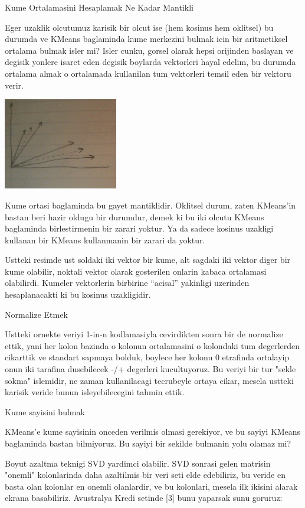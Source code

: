 \documentclass[12pt,fleqn]{article}\usepackage{../common}
\begin{document}
Kume Ortalamasini Hesaplamak Ne Kadar Mantikli

Eger uzaklik olcutumuz karisik bir olcut ise (hem kosinus hem oklitsel) bu
durumda ve KMeans baglaminda kume merkezini bulmak icin bir aritmetiksel
ortalama bulmak isler mi? Isler cunku, gorsel olarak hepsi orijinden
baslayan ve degisik yonlere isaret eden degisik boylarda vektorleri hayal
edelim, bu durumda ortalama almak o ortalamada kullanilan tum vektorleri
temsil eden bir vektoru verir. 

\includegraphics[height=4cm]{kmeans_5.jpg}

Kume ortasi baglaminda bu gayet mantiklidir. Oklitsel durum, zaten
KMeans'in bastan beri hazir oldugu bir durumdur, demek ki bu iki olcutu
KMeans baglaminda birlestirmenin bir zarari yoktur. Ya da sadece kosinus
uzakligi kullanan bir KMeans kullanmanin bir zarari da yoktur. 

Ustteki resimde ust soldaki iki vektor bir kume, alt sagdaki iki vektor
diger bir kume olabilir, noktali vektor olarak gosterilen onlarin kabaca
ortalamasi olabilirdi. Kumeler vektorlerin birbirine ``acisal'' yakinligi
uzerinden hesaplanacakti ki bu kosinus uzakligidir.

Normalize Etmek

Ustteki ornekte veriyi 1-in-n kodlamasiyla cevirdikten sonra bir de
normalize ettik, yani her kolon bazinda o kolonun ortalamasini o
kolondaki tum degerlerden cikarttik ve standart sapmaya bolduk,
boylece her kolonu 0 etrafinda ortalayip onun iki tarafina dusebilecek
-/+ degerleri kucultuyoruz. Bu veriyi bir tur "sekle sokma" islemidir,
ne zaman kullanilacagi tecrubeyle ortaya cikar, mesela ustteki karisik
veride bunun isleyebilecegini tahmin ettik. 

Kume sayisini bulmak

KMeans'e kume sayisinin onceden verilmis olmasi gerekiyor, ve bu
sayiyi KMeans baglaminda bastan bilmiyoruz. Bu sayiyi bir sekilde
bulmanin yolu olamaz mi?

Boyut azaltma teknigi SVD yardimci olabilir. SVD sonrasi gelen
matrisin "onemli" kolonlarinda daha azaltilmis bir veri seti elde
edebiliriz, bu veride en basta olan kolonlar en onemli olanlardir, ve
bu kolonlari, mesela ilk ikisini alarak ekrana basabiliriz. Avustralya
Kredi setinde [3] bunu yaparsak sunu goruruz:
\end{document}
